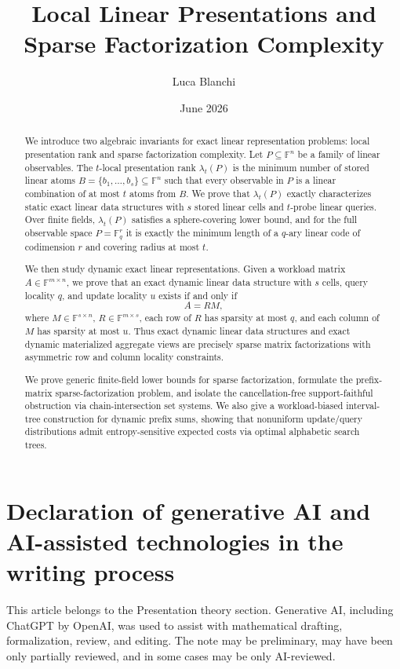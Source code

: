 \documentclass[11pt]{article}
\title{Local Linear Presentations and Sparse Factorization Complexity}
\author{Luca Blanchi}
\date{June 2026}
\begin{document}
\maketitle

\begin{abstract}
We introduce two algebraic invariants for exact linear representation problems: local presentation rank and sparse factorization complexity. Let $P\subseteq \mathbb F^n$ be a family of linear observables. The $t$-local presentation rank $\lambda_t(P)$ is the minimum number of stored linear atoms $B=\{b_1,\ldots,b_s\}\subseteq \mathbb F^n$ such that every observable in $P$ is a linear combination of at most $t$ atoms from $B$. We prove that $\lambda_t(P)$ exactly characterizes static exact linear data structures with $s$ stored linear cells and $t$-probe linear queries. Over finite fields, $\lambda_t(P)$ satisfies a sphere-covering lower bound, and for the full observable space $P=\mathbb F_q^r$ it is exactly the minimum length of a $q$-ary linear code of codimension $r$ and covering radius at most $t$.

We then study dynamic exact linear representations. Given a workload matrix $A\in \mathbb F^{m\times n}$, we prove that an exact dynamic linear data structure with $s$ cells, query locality $q$, and update locality $u$ exists if and only if
\[
A=RM,
\]
where $M\in\mathbb F^{s\times n}$, $R\in\mathbb F^{m\times s}$, each row of $R$ has sparsity at most $q$, and each column of $M$ has sparsity at most $u$. Thus exact dynamic linear data structures and exact dynamic materialized aggregate views are precisely sparse matrix factorizations with asymmetric row and column locality constraints.

We prove generic finite-field lower bounds for sparse factorization, formulate the prefix-matrix sparse-factorization problem, and isolate the cancellation-free support-faithful obstruction via chain-intersection set systems. We also give a workload-biased interval-tree construction for dynamic prefix sums, showing that nonuniform update/query distributions admit entropy-sensitive expected costs via optimal alphabetic search trees.
\end{abstract}

\section*{Declaration of generative AI and AI-assisted technologies in the writing process}
This article belongs to the Presentation theory section. Generative AI, including ChatGPT by \mbox{OpenAI}, was used to assist with mathematical drafting, formalization, review, and editing. The note may be preliminary, may have been only partially reviewed, and in some cases may be only AI-reviewed.
\end{document}
